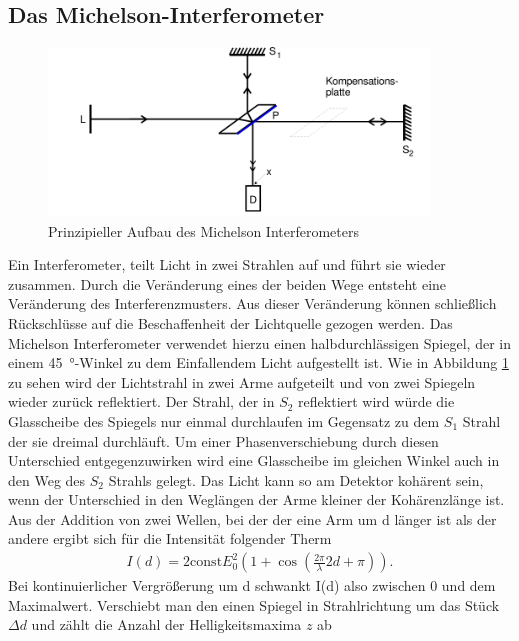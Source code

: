 \subsection{Das Michelson-Interferometer}
\begin{figure}
    \centering
    \includegraphics[width=0.9\textwidth]{18_v401/Abbildungen/Screenshot (4).png}
    \caption{Prinzipieller Aufbau des Michelson Interferometers \cite{man:v401}}
    \label{fig:schema_a}
\end{figure}
Ein Interferometer, teilt Licht in zwei Strahlen auf und führt sie wieder zusammen.
Durch die Veränderung eines der beiden Wege entsteht eine Veränderung des Interferenzmusters.
Aus dieser Veränderung können schließlich Rückschlüsse auf die Beschaffenheit der Lichtquelle gezogen werden.
Das Michelson Interferometer verwendet hierzu einen halbdurchlässigen Spiegel, der in einem \qty{45}{\degree}-Winkel 
zu dem Einfallendem Licht aufgestellt ist. 
Wie in Abbildung \ref{fig:schema_a} zu sehen wird der Lichtstrahl in zwei Arme aufgeteilt und von zwei Spiegeln wieder zurück reflektiert.
Der Strahl, der in $S_2$ reflektiert wird würde die Glasscheibe des Spiegels nur einmal durchlaufen im Gegensatz zu dem $S_1$ Strahl
der sie dreimal durchläuft.
Um einer Phasenverschiebung durch diesen Unterschied entgegenzuwirken wird eine Glasscheibe im gleichen Winkel 
auch in den Weg des $S_2$ Strahls gelegt.
Das Licht kann so am Detektor kohärent sein, wenn der Unterschied in den Weglängen der Arme kleiner der Kohärenzlänge ist.
Aus der Addition von zwei Wellen, bei der der eine Arm um d länger ist als der andere ergibt sich für die Intensität folgender Therm
\begin{align}
    I(d) = 2 \text{const} E_0^2 \left(1+ \cos\left(\frac{2\pi}{\lambda} 2d + \pi\right)\right).
\end{align}
Bei kontinuierlicher Vergrößerung um d schwankt I(d) also zwischen 0 und dem Maximalwert.
Verschiebt man den einen Spiegel in Strahlrichtung um das Stück $\Delta d$ und zählt die Anzahl der Helligkeitsmaxima $z$ ab
